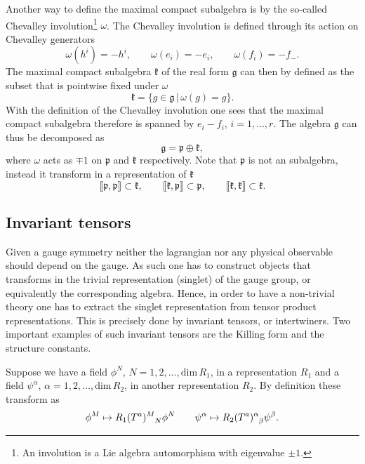 Another way to define the maximal compact subalgebra is by the so-called Chevalley involution\footnote{An involution is a Lie algebra automorphism with eigenvalue $\pm 1$.} $\omega$. The Chevalley involution is defined through its action on Chevalley generators
\begin{equation}
    \omega(h^i) = -h^i,\qquad \omega(e_i) = -e_i, \qquad \omega(f_i) = -f_-.
\end{equation}
The maximal compact subalgebra $\mathfrak{k}$ of the real form $\mathfrak{g}$ can then by defined as the subset that is pointwise fixed under $\omega$
\begin{equation}
    \mathfrak{k} = \{g\in\mathfrak{g}\,|\, \omega (g) = g \}. 
\end{equation}
With the definition of the Chevalley involution one sees that the maximal compact subalgebra therefore is spanned by $e_i-f_i$, $i=1,\ldots,r$. The algebra $\mathfrak{g}$ can thus be decomposed as 
\begin{equation}
    \mathfrak{g} = \mathfrak{p}\oplus\mathfrak{k},
\end{equation}
where $\omega$ acts as $\mp 1$ on $\mathfrak{p}$ and $\mathfrak{k}$ respectively. Note that $\mathfrak{p}$ is not an subalgebra, instead it transform in a representation of $\mathfrak{k}$ 
\begin{equation}
    \llbracket \mathfrak{p},\mathfrak{p}\rrbracket \subset \mathfrak{k},\qquad \llbracket \mathfrak{k},\mathfrak{p}\rrbracket\subset \mathfrak{p},\qquad \llbracket \mathfrak{k},\mathfrak{k}\rrbracket \subset \mathfrak{k}.
\end{equation}

\subsection{Invariant tensors}
Given a gauge symmetry neither the lagrangian nor any physical observable should depend on the gauge. As such one has to construct objects that transforms in the trivial representation (singlet) of the gauge group, or equivalently the corresponding algebra. Hence, in order to have a non-trivial theory one has to extract the singlet representation from tensor product representations. This is precisely done by invariant tensors, or intertwiners. Two important examples of such invariant tensors are the Killing form and the structure constants. 

Suppose we have a field $\phi^N$, $N=1,2,\ldots,\text{dim}\,R_1$, in a representation $R_1$ and a field $\psi^\alpha$, $\alpha=1,2,\ldots,\text{dim}\,R_2$, in another representation $R_2$. By definition these transform as 
\begin{equation}
    \phi^M \mapsto \tensor{R_1(T^a)}{^M_N}\phi^N \qquad \psi^\alpha\mapsto \tensor{R_2(T^a)}{^\alpha_\beta}\psi^\beta.
\end{equation}

